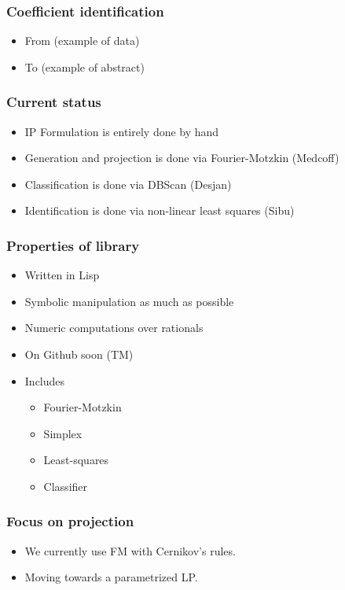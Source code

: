 \documentclass{beamer}
\begin{document}
\begin{frame}
  \frametitle{Coefficient identification}
  \begin{itemize}
  \item<1-> From (example of data)
  \item<2-> To (example of abstract)
  \end{itemize}
\end{frame}

\begin{frame}
  \frametitle{Current status}
  \begin{itemize}
  \item<1-> IP Formulation is entirely done by hand
  \item<2-> Generation and projection is done via Fourier-Motzkin (Medcoff)
  \item<3-> Classification is done via DBScan (Desjan)
  \item<4-> Identification is done via non-linear least squares (Sibu)
  \end{itemize}
\end{frame}

\begin{frame}
  \frametitle{Properties of library}
  \begin{itemize}
  \item<1-> Written in Lisp
  \item<2-> Symbolic manipulation as much as possible
  \item<3-> Numeric computations over rationals
  \item<4-> On Github soon (TM)
  \item<5-> Includes
    \begin{itemize}
    \item Fourier-Motzkin
    \item Simplex
    \item Least-squares
    \item Classifier
    \end{itemize}
  \end{itemize}
\end{frame}

\begin{frame}
  \frametitle{Focus on projection}
  \begin{itemize}
  \item<1-> We currently use FM with Cernikov's rules.
  \item<2-> Moving towards a parametrized LP.
  \end{itemize}
\end{frame}
\end{document}
